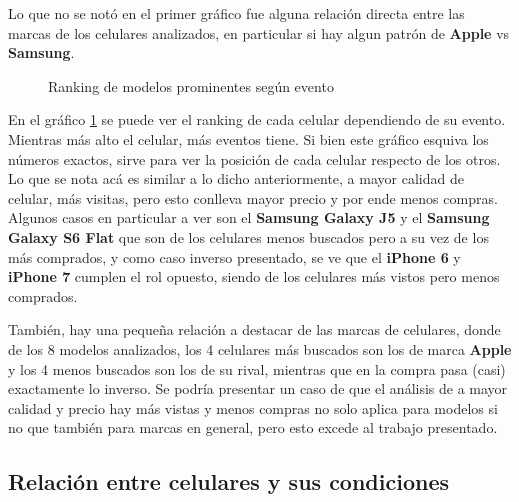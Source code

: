 \documentclass[a4paper]{article}
\begin{document}
Lo que no se notó en el primer gráfico fue alguna relación directa entre las marcas de los celulares analizados, en particular si hay algun patrón de \textbf{Apple} vs \textbf{Samsung}.

\begin{figure}[h!]
	\caption{Ranking de modelos prominentes según evento}
	\label{fig:prominentesrank}
\end{figure}

En el gráfico \ref{fig:prominentesrank} se puede ver el ranking de cada celular dependiendo de su evento. Mientras más alto el celular, más eventos tiene. Si bien este gráfico esquiva los números exactos, sirve para ver la posición de cada celular respecto de los otros. Lo que se nota acá es similar a lo dicho anteriormente, a mayor calidad de celular, más visitas, pero esto conlleva mayor precio y por ende menos compras. Algunos casos en particular a ver son el \textbf{Samsung Galaxy J5} y el \textbf{Samsung Galaxy S6 Flat} que son de los celulares menos buscados pero a su vez de los más comprados, y como caso inverso presentado, se ve que el \textbf{iPhone 6} y \textbf{iPhone 7} cumplen el rol opuesto, siendo de los celulares más vistos pero menos comprados.

También, hay una pequeña relación a destacar de las marcas de celulares, donde de los 8 modelos analizados, los 4 celulares más buscados son los de marca \textbf{Apple} y los 4 menos buscados son los de su rival, mientras que en la compra pasa (casi) exactamente lo inverso. Se podría presentar un caso de que el análisis de a mayor calidad y precio hay más vistas y menos compras no solo aplica para modelos si no que también para marcas en general, pero esto excede al trabajo presentado.

\subsection{Relación entre celulares y sus condiciones}
\end{document}
